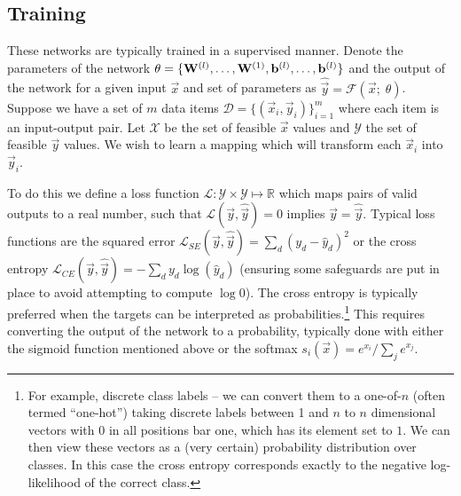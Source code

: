 \subsection{Training}
These networks are typically trained in a supervised manner. Denote the parameters of the network
\(\theta = \{\mathbf{W}^{(l)}, \ldots, \mathbf{W}^{(1)}, \mathbf{b}^{(l)}, \ldots, \mathbf{b}^{(l)}\}\) and
the output of the network for a given input \(\vec{x}\) and set of parameters as 
\(\hat{\vec{y}} = \mathcal{F}(\vec{x};\; \theta)\). Suppose we have a set of \(m\) data items
\(\mathcal{D} = \{(\vec{x}_i, \vec{y}_i)\}_{i=1}^m\) where each item is an input-output pair. 
Let \(\mathcal{X}\) be the set of feasible \(\vec{x}\) values and \(\mathcal{Y}\) the set of
feasible \(\vec{y}\) values.
We
wish to learn a mapping which will transform each  \(\vec{x}_i\) into \(\vec{y}_i\).

To do this we define a loss function
\(\mathcal{L} : \mathcal{Y} \times \mathcal{Y} \mapsto \mathbb{R}\) which maps pairs of valid outputs
to a real number, such that \(\mathcal{L}(\vec{y}, \hat{\vec{y}}) = 0\) implies 
\(\vec{y} = \hat{\vec{y}}\). Typical loss functions are the squared error
\( \label{eq:squarederror}
	\mathcal{L}_{SE}(\vec{y}, \hat{\vec{y}}) 
	= \sum_d (y_d - \hat{y}_d)^2
\) or the cross entropy
\(
	\mathcal{L}_{CE}(\vec{y}, \hat{\vec{y}}) = -\sum_d y_d \log(\hat{y}_d)
\) (ensuring some safeguards are put in place to avoid attempting to compute \(\log 0\)).
The cross entropy is typically preferred when the targets can be interpreted as
probabilities.\footnote{For example, discrete class labels -- we can convert them to a one-of-\(n\)
(often termed ``one-hot'') taking discrete labels between 1 and \(n\) to \(n\) dimensional vectors
with \(0\) in all positions bar one, which has its element set to \(1\). We can then view these
vectors as a (very certain) probability distribution over classes. In this case the cross entropy
corresponds exactly to the negative log-likelihood of the correct class.} This requires converting
the output of the network to a probability, typically done with either the sigmoid function 
mentioned above or the softmax \(s_i(\vec{x}) = e^{x_i}/\sum_j e^{x_j}\).

